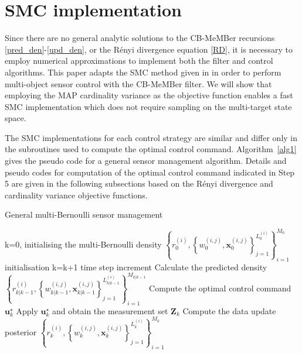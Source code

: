 \documentclass[twocolumn]{autart}
\begin{document}
\section{SMC implementation}

Since there are no general analytic solutions to the CB-MeMBer recursions \eqref{pred_den}-\eqref{upd_den}, or the R\'{e}nyi divergence equation \eqref{RD}, it is necessary to employ numerical approximations to implement
both the filter and control algorithms. This paper adapts the SMC method
given in \cite{RAG04} in order to perform multi-object sensor control with
the CB-MeMBer filter. We will show that employing the MAP cardinality variance as
the objective function enables a fast SMC implementation which does not require
sampling on the multi-target state space.

The SMC implementations for each control strategy are similar and differ only in the subroutines used to compute the optimal control command. Algorithm~\ref{alg1} gives the pseudo code for a general sensor management algorithm. Details and pseudo codes for computation of the optimal control command indicated in Step 5 are given in the following subsections based on the  R\'enyi divergence and cardinality variance objective functions.
\renewcommand{\algorithmicrequire}{\textbf{Inputs:}} \renewcommand{\algorithmicensure}{\textbf{Outputs:}}
\begin{algorithm}[htb]
\caption{General multi-Bernoulli sensor management}
\label{alg1}
\begin{algorithmic}[1]
    \State k=0, initialising the multi-Bernoulli density $\left\lbrace r_0^{(i)}, \left\lbrace w_0^{(i,j)},\mathbf{x}_0^{(i,j)}\right\rbrace_{j=1}^{L_0^{(i)}}\right\rbrace_{i=1}^{M_0}$ \Comment initialisation
    \Repeat
    \State k=k+1 \Comment time step increment
    \State Calculate the predicted density 
     \Statex \quad \;$\left\lbrace r_{k|k-1}^{(i)}, \left\lbrace w_{k|k-1}^{(i,j)},\mathbf{x}_{k|k-1}^{(i,j)}\right\rbrace_{j=1}^{L_{k|k-1}^{(i)}}\right\rbrace_{i=1}^{M_{k|k-1}}$ 
    \State Compute the optimal control command $\mathbf{u}_k^\star$
    \State Apply $\mathbf{u}_k^\star$ and obtain the measurement set $\mathbf{Z}_{k}$
    \State Compute the data update posterior
    \Statex \quad \;$\left\lbrace r_{k}^{(i)}, \left\lbrace w_{k}^{(i,j)},\mathbf{x}_{k}^{(i,j)}\right\rbrace_{j=1}^{L_{k}^{(i)}}\right\rbrace_{i=1}^{M_{k}}$
\end{algorithmic}
\end{algorithm}
\end{document}
